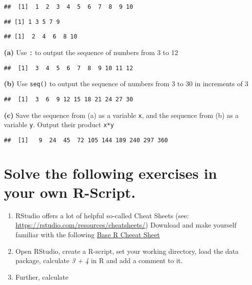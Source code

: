 \documentclass[
]{article}
\begin{document}
\begin{verbatim}
##  [1]  1  2  3  4  5  6  7  8  9 10
\end{verbatim}

\begin{verbatim}
## [1] 1 3 5 7 9
\end{verbatim}

\begin{verbatim}
## [1]  2  4  6  8 10
\end{verbatim}

\textbf{(a)} Use \texttt{:} to output the sequence of numbers from 3 to
12

\begin{verbatim}
##  [1]  3  4  5  6  7  8  9 10 11 12
\end{verbatim}

\textbf{(b)} Use \texttt{seq()} to output the sequence of numbers from 3
to 30 in increments of 3

\begin{verbatim}
##  [1]  3  6  9 12 15 18 21 24 27 30
\end{verbatim}

\textbf{(c)} Save the sequence from (a) as a variable \texttt{x}, and
the sequence from (b) as a variable \texttt{y}. Output their product
\texttt{x*y}

\begin{verbatim}
##  [1]   9  24  45  72 105 144 189 240 297 360
\end{verbatim}

\hypertarget{solve-the-following-exercises-in-your-own-r-script.}{%
\section{Solve the following exercises in your own
R-Script.}\label{solve-the-following-exercises-in-your-own-r-script.}}

\begin{enumerate}
\def\labelenumi{\arabic{enumi}.}
\item
  RStudio offers a lot of helpful so-called Cheat Sheets (see:
  \url{https://rstudio.com/resources/cheatsheets/}) Download and make
  yourself familiar with the following
  \href{https://rstudio.com/wp-content/uploads/2016/10/r-cheat-sheet-3.pdf}{Base
  R Cheeat Sheet}
\item
  Open RStudio, create a R-script, set your working directory, load the
  data package, calculate \emph{3 + 4} in R and add a comment to it.
\item
  Further, calculate
\end{enumerate}
\end{document}
